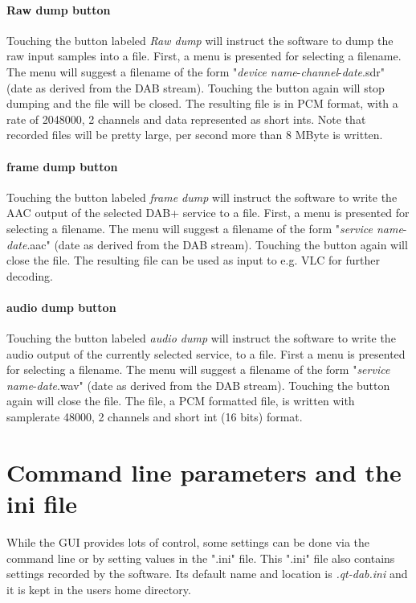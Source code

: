 \documentclass[12pt]{article}
\begin{document}
\paragraph{Raw dump button}
Touching the button labeled {\em Raw dump} will instruct the
software to dump the raw input samples into a file.
First, a menu is presented for selecting a filename. The menu will suggest
a filename of the form  "{\em device name}-{\em channel}-{\em date}.sdr" (date as derived
from the DAB stream).
Touching the button again will stop dumping and the file will be closed.
The resulting file is in PCM format, with a rate of 2048000, 2 channels and 
data represented as short ints.
Note that recorded files will be pretty large, per second more than
8 MByte is written.
\paragraph{frame dump button}
Touching the button labeled {\em frame dump} will  instruct the
software to write the AAC output of the selected
DAB+ service  to a file.
First, a menu is presented for selecting a filename. The menu will
suggest a filename of the form "{\em service name}-{\em date}.aac" (date  
as derived from the DAB stream).
Touching the button again will close the file.
The resulting file can be used as input to e.g.
VLC for further decoding.
\paragraph{audio dump button} 
Touching the button labeled {\em audio dump} will instruct the
software to write the audio output of
the currently selected service, to a file.
First a menu is presented for selecting a filename. The menu will suggest
a filename of the form "{\em service name}-{\em date}.wav" (date
as derived from the DAB stream).
Touching the button again will close the file.
The file, a PCM
formatted file, is written with samplerate 48000, 2 channels and 
short int (16 bits) format.
\section{Command line parameters and the ini file}
While the GUI provides lots of control, some settings can be done
via the command line or by setting values in the ".ini" file.
This ".ini" file also contains settings recorded by the software.
Its default name and location is {\em .qt-dab.ini} and it is kept in the
users home directory.
\end{document}
